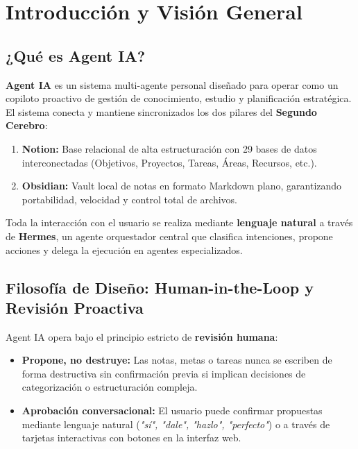 \documentclass[11pt,a4paper]{article}
\begin{document}
\tableofcontents
\newpage

\section{Introducción y Visión General}

\subsection{¿Qué es Agent IA?}
\textbf{Agent IA} es un sistema multi-agente personal diseñado para operar como un copiloto proactivo de gestión de conocimiento, estudio y planificación estratégica. El sistema conecta y mantiene sincronizados los dos pilares del \textbf{Segundo Cerebro}:
\begin{enumerate}[leftmargin=1.5cm]
    \item \textbf{Notion:} Base relacional de alta estructuración con 29 bases de datos interconectadas (Objetivos, Proyectos, Tareas, Áreas, Recursos, etc.).
    \item \textbf{Obsidian:} Vault local de notas en formato Markdown plano, garantizando portabilidad, velocidad y control total de archivos.
\end{enumerate}

Toda la interacción con el usuario se realiza mediante \textbf{lenguaje natural} a través de \textbf{Hermes}, un agente orquestador central que clasifica intenciones, propone acciones y delega la ejecución en agentes especializados.

\subsection{Filosofía de Diseño: Human-in-the-Loop y Revisión Proactiva}
Agent IA opera bajo el principio estricto de \textbf{revisión humana}:
\begin{itemize}
    \item \textbf{Propone, no destruye:} Las notas, metas o tareas nunca se escriben de forma destructiva sin confirmación previa si implican decisiones de categorización o estructuración compleja.
    \item \textbf{Aprobación conversacional:} El usuario puede confirmar propuestas mediante lenguaje natural (\textit{"sí", "dale", "hazlo", "perfecto"}) o a través de tarjetas interactivas con botones en la interfaz web.
\end{itemize}
\end{document}
